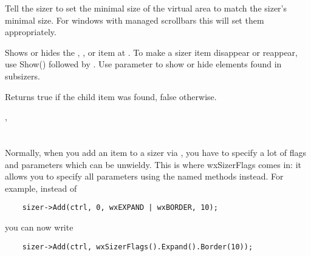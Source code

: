 \label{wxsizersetvirtualsizehints}


Tell the sizer to set the minimal size of the  virtual area to match the sizer's
minimal size. For windows with managed scrollbars this will set them appropriately.




\label{wxsizershow}




Shows or hides the , , or item at .
To make a sizer item disappear or reappear, use Show() followed by .
Use parameter  to show or hide elements found in subsizers.

Returns true if the child item was found, false otherwise.


,\rtfsp
{}




\section{}\label{wxsizerflags}

Normally, when you add an item to a sizer via 
, you have to specify a lot of flags and
parameters which can be unwieldy. This is where wxSizerFlags comes in: it
allows you to specify all parameters using the named methods instead. For
example, instead of

\begin{verbatim}
    sizer->Add(ctrl, 0, wxEXPAND | wxBORDER, 10);
\end{verbatim}

you can now write

\begin{verbatim}
    sizer->Add(ctrl, wxSizerFlags().Expand().Border(10));
\end{verbatim}


